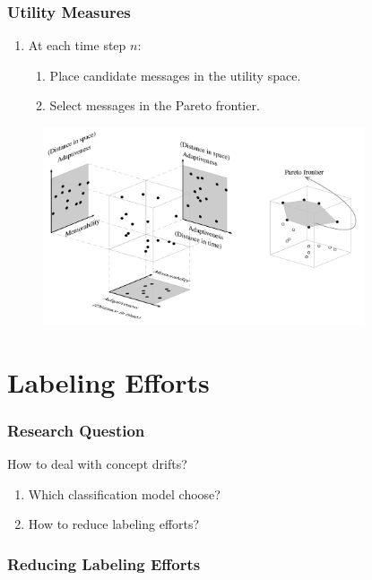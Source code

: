 \documentclass[14pt]{beamer}
\begin{document}
\begin{frame}\frametitle{Utility Measures}

\begin{enumerate}
\item At each time step $n$:
\begin{enumerate}
\item Place candidate messages in the utility space.
\item Select messages in the Pareto frontier.
\end{enumerate}
\end{enumerate}

\vspace{-0.1in}
\begin{figure}
\centering
\includegraphics[height=2.30in]{pareto}
\end{figure}

\end{frame}

\section{Labeling Efforts}
\begin{frame}\frametitle{Research Question}

\centering
\large{How to deal with concept drifts?}
\vspace{0.5in}
\small{\begin{enumerate}
\item Which classification model choose?
\item \alert{How to reduce labeling efforts?}
\end{enumerate}}
\end{frame}

\begin{frame}\frametitle{Reducing Labeling Efforts}

\end{frame}
\end{document}

